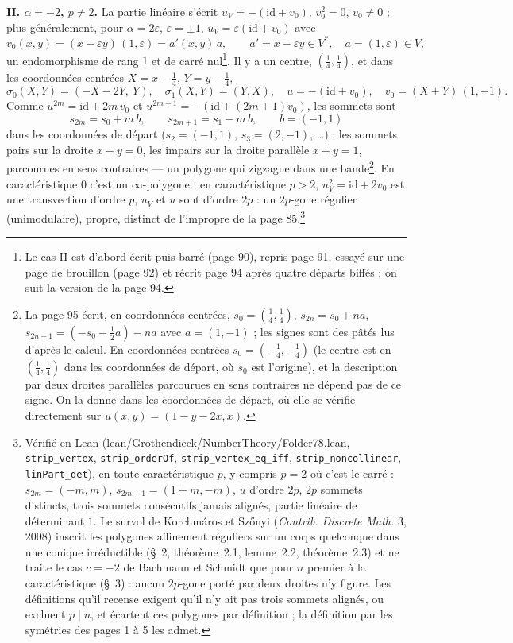 \documentclass[11pt,a4paper]{article}
\begin{document}
\textbf{II. $\alpha = -2$, $p \neq 2$.} La partie linéaire s'écrit $u_V =
-(\mathrm{id} + v_0)$, $v_0^2 = 0$, $v_0 \neq 0$ ; plus généralement, pour
$\alpha = 2\varepsilon$, $\varepsilon = \pm 1$, $u_V = \varepsilon(\mathrm{id}
+ v_0)$ avec
\[
  v_0(x, y) = (x - \varepsilon y)\,(1, \varepsilon) = a'(x, y)\, a, \qquad
  a' = x - \varepsilon y \in V^{*}, \quad a = (1, \varepsilon) \in V ,
\]
un endomorphisme de rang $1$ et de carré nul\footnote{Le cas II est d'abord
écrit puis barré (page 90), repris page 91, essayé sur une page de brouillon
(page 92) et récrit page 94 après quatre départs biffés ; on suit la version
de la page 94.}. Il y a un centre, $(\frac14, \frac14)$, et dans les
coordonnées centrées $X = x - \frac14$, $Y = y - \frac14$,
\[
  \sigma_0(X, Y) = (-X - 2Y,\ Y), \quad \sigma_1(X, Y) = (Y, X), \quad
  u = -(\mathrm{id} + v_0), \quad v_0 = (X + Y)\,(1, -1) .
\]
Comme $u^{2m} = \mathrm{id} + 2m\, v_0$ et $u^{2m+1} = -(\mathrm{id} +
(2m+1) v_0)$, les sommets sont
\[
  s_{2m} = s_0 + m\, b, \qquad s_{2m+1} = s_1 - m\, b, \qquad b = (-1, 1)
\]
dans les coordonnées de départ ($s_2 = (-1, 1)$, $s_3 = (2, -1)$, \ldots) :
les sommets pairs sur la droite $x + y = 0$, les impairs sur la droite
parallèle $x + y = 1$, parcourues en sens contraires --- un polygone qui
zigzague dans une bande\footnote{La page 95 écrit, en coordonnées centrées,
$s_0 = (\frac14, \frac14)$, $s_{2n} = s_0 + n a$, $s_{2n+1} = (-s_0 - \frac12
a) - na$ avec $a = (1, -1)$ ; les signes sont des pâtés lus d'après le calcul.
En coordonnées centrées $s_0 = (-\frac14, -\frac14)$ (le centre est en
$(\frac14, \frac14)$ dans les coordonnées de départ, où $s_0$ est l'origine),
et la description par deux droites parallèles parcourues en sens contraires
ne dépend pas de ce signe. On la donne dans les coordonnées de départ, où elle
se vérifie directement sur $u(x, y) = (1 - y - 2x, x)$.}. En
caractéristique $0$ c'est un $\infty$-polygone ; en caractéristique $p > 2$,
$u_V^2 = \mathrm{id} + 2v_0$ est une transvection d'ordre $p$, $u_V$ et $u$
sont d'ordre $2p$ : un $2p$-gone régulier (unimodulaire), propre, distinct de
l'impropre de la page 85.\footnote{Vérifié en Lean
(lean/Grothendieck/NumberTheory/Folder78.lean, \texttt{strip\_vertex}, \texttt{strip\_orderOf},
\texttt{strip\_vertex\_eq\_iff}, \texttt{strip\_noncollinear},
\texttt{linPart\_det}), en toute caractéristique $p$, y compris $p = 2$ où
c'est le carré : $s_{2m} = (-m, m)$, $s_{2m+1} = (1 + m, -m)$, $u$ d'ordre
$2p$, $2p$ sommets distincts, trois sommets consécutifs jamais alignés,
partie linéaire de déterminant $1$. Le survol de Korchmáros et Szőnyi
(\emph{Contrib. Discrete Math.} 3, 2008) inscrit les polygones affinement
réguliers sur un corps quelconque dans une conique irréductible (§~2,
théorème~2.1, lemme~2.2, théorème~2.3) et ne traite le cas $c = -2$ de
Bachmann et Schmidt que pour $n$ premier à la caractéristique (§~3) : aucun
$2p$-gone porté par deux droites n'y figure. Les définitions qu'il recense
exigent qu'il n'y ait pas trois sommets alignés, ou excluent $p \mid n$, et
écartent ces polygones par définition ; la définition par les symétries des
pages 1 à 5 les admet.}
\end{document}
